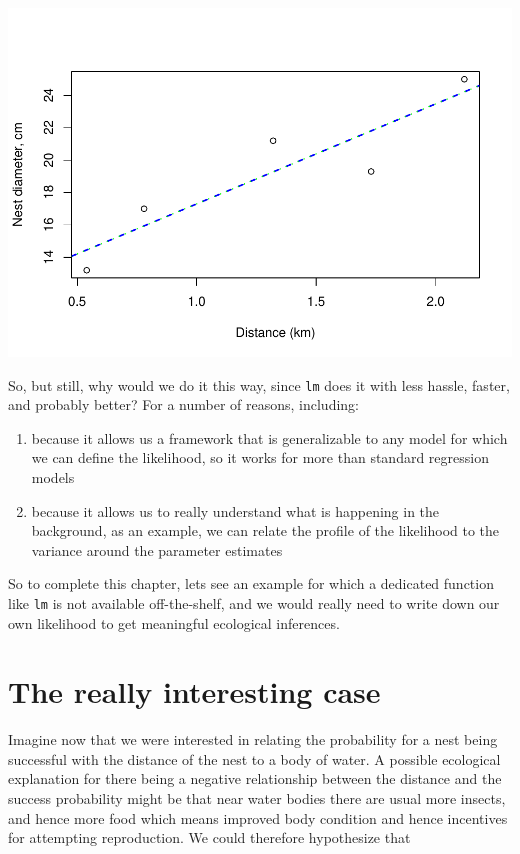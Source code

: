 \documentclass[
]{book}
\providecommand{\tightlist}{%
  \setlength{\itemsep}{0pt}\setlength{\parskip}{0pt}}
\begin{document}
\includegraphics{ECOMODbook_files/figure-latex/ch13.30.5-1.pdf}

So, but still, why would we do it this way, since \texttt{lm} does it with less hassle, faster, and probably better? For a number of reasons, including:

\begin{enumerate}
\def\labelenumi{\arabic{enumi}.}
\tightlist
\item
  because it allows us a framework that is generalizable to any model for which we can define the likelihood, so it works for more than standard regression models
\item
  because it allows us to really understand what is happening in the background, as an example, we can relate the profile of the likelihood to the variance around the parameter estimates
\end{enumerate}

So to complete this chapter, lets see an example for which a dedicated function like \texttt{lm} is not available off-the-shelf, and we would really need to write down our own likelihood to get meaningful ecological inferences.

\section{The really interesting case}\label{the-really-interesting-case}

Imagine now that we were interested in relating the probability for a nest being successful with the distance of the nest to a body of water. A possible ecological explanation for there being a negative relationship between the distance and the success probability might be that near water bodies there are usual more insects, and hence more food which means improved body condition and hence incentives for attempting reproduction. We could therefore hypothesize that
\end{document}
